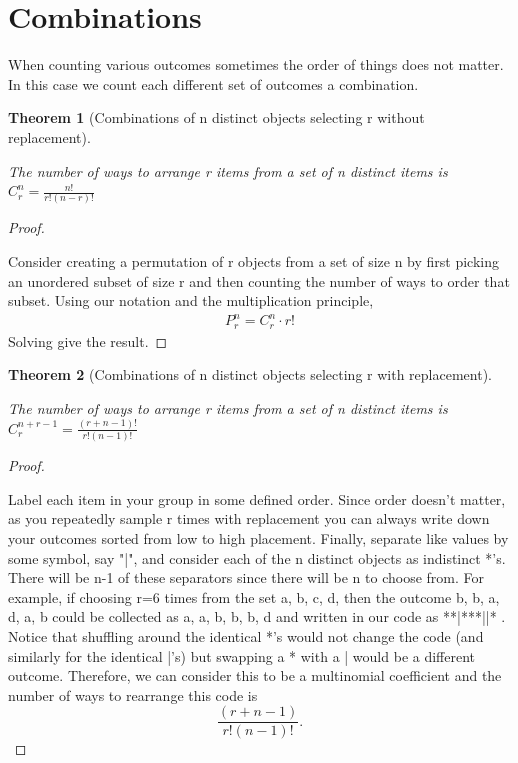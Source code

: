 \documentclass[10pt,]{book}
\theoremstyle{plain}
\newtheorem{theorem}{Theorem}[section]
\theoremstyle{definition}
\theoremstyle{definition}
\theoremstyle{definition}
\numberwithin{equation}{section}
\begin{document}
\section[{Combinations}]{Combinations}\label{section-15}
When counting various outcomes sometimes the order of things does not matter.
In this case we count each different set of outcomes a combination. %
\begin{theorem}[{Combinations of n distinct objects selecting r without replacement}]\label{theorem-14}

			The number of ways to arrange r items from a set of n distinct items 
			is \( C_r^n = \frac{n!}{r!(n-r)!} \)
\end{theorem}
\begin{proof}\hypertarget{proof-10}{}

			Consider creating a permutation of r objects from a set of size n
			by first picking an unordered subset of size r and then counting 
			the number of ways to order that subset. Using our notation and the
			multiplication principle,
			\begin{gather*}
P_r^n = C_r^n \cdot r!
\end{gather*}
			Solving give the result.
\end{proof}
\begin{theorem}[{Combinations of n distinct objects selecting r with replacement}]\label{theorem-15}

			The number of ways to arrange r items from a set of n distinct items 
			is \( C_r^{n+r-1} = \frac{(r+n-1)!}{r!(n-1)!} \)
\end{theorem}
\begin{proof}\hypertarget{proof-11}{}

			Label each item in your group in some defined order. Since order doesn't matter, as you repeatedly sample r times with replacement you can always write down your outcomes sorted from low to high placement. Finally, separate like values by some symbol, say "|", and consider each of the n distinct objects as indistinct *'s. There will be n-1 of these separators since there will be n to choose from. For example, if choosing r=6 times from the set {a, b, c, d}, then the outcome b, b, a, d, a, b could be collected as a, a, b, b, b, d and written in our code as **|***||* .  Notice that shuffling around the identical *'s would not change the code (and similarly for the identical |'s) but swapping a * with a | would be a different outcome. Therefore, we can consider this to be a multinomial coefficient and the number of ways to rearrange this code is
			\begin{equation*}\frac{(r + n-1)}{r!(n-1)!}.\end{equation*}
\end{proof}
\end{document}
